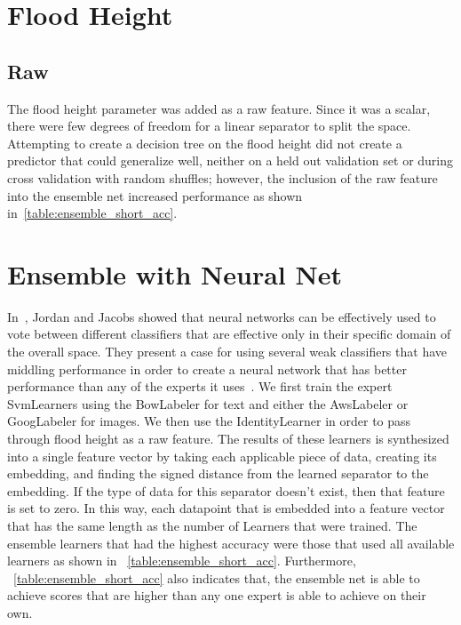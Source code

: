 \section{Flood Height}
\subsection{Raw}
The flood height parameter was added as a raw feature. Since it was a scalar,
there were few degrees of freedom for a linear separator to split the space.
Attempting to create a decision tree on the flood height did not create a
predictor that could generalize well, neither on a held out validation set or
during cross validation with random shuffles; however, the inclusion of the raw
feature into the ensemble net increased performance as shown
in~\ref{table:ensemble_short_acc}.

\section{Ensemble with Neural Net}
In~\cite{jordanHierarchicalMixturesExperts1994}, Jordan and Jacobs showed that
neural networks can be effectively used to vote between different classifiers
that are effective only in their specific domain of the overall space. They present a
case for using several weak classifiers that have middling performance in order
to create a neural network that has better performance than any of the experts
it uses~\cite{jordanHierarchicalMixturesExperts1994}. We first train the expert
SvmLearners using the BowLabeler for text and either the AwsLabeler or
GoogLabeler for images. We then use the IdentityLearner in order to pass through
flood height as a raw feature. The results of these learners is synthesized into
a single feature vector by taking each applicable piece of data, creating its
embedding, and finding the signed distance from the learned separator to the
embedding. If the type of data for this separator doesn't exist, then that
feature is set to zero. In this way, each datapoint that is embedded into a
feature vector that has the same length as the number of Learners that were
trained. The ensemble learners that had the highest accuracy were those that
used all available learners as shown in
\tableautoref{}~\ref{table:ensemble_short_acc}. Furthermore,
\tableautorefname{}~\ref{table:ensemble_short_acc} also indicates that, the
ensemble net is able to achieve scores that are higher than any one expert is
able to achieve on their own.

